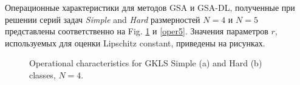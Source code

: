 \documentclass[runningheads]{llncs}
\begin{document}
Операционные характеристики для методов GSA и GSA-DL, полученные при решении серий задач \textit{Simple} and \textit{Hard} размерностей $N=4$ и $N=5$ представлены соответственно на Fig. \ref{oper4} и \ref{oper5}. Значения параметров $r$, используемых для оценки Lipschitz constant, приведены на рисунках.

\begin{figure}
\begin{minipage}{0.5\linewidth}
\end{minipage}
\hfill
\begin{minipage}{0.5\linewidth}
\end{minipage}
\caption{Operational characteristics for GKLS Simple (a) and Hard (b) classes, $N=4$.}
\label{oper4}
\end{figure}
\end{document}
